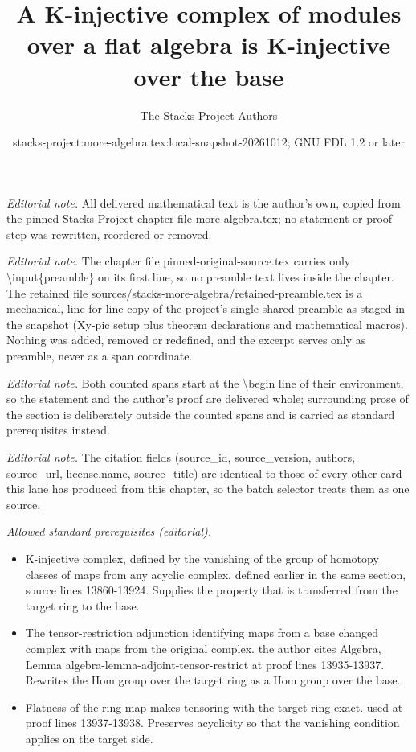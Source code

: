\documentclass[10pt,a4paper]{amsart}
\title{A K-injective complex of modules over a flat algebra is K-injective over the base}
\author{The Stacks Project Authors}
\date{stacks-project:more-algebra.tex:local-snapshot-20261012; GNU FDL 1.2 or later}
\theoremstyle{plain}
\theoremstyle{definition}
\theoremstyle{remark}
\numberwithin{equation}{subsection}
\begin{document}
\maketitle
\setcounter{subsection}{1}
\noindent\textit{Editorial note.} All delivered mathematical text is the author's own, copied from the pinned Stacks Project chapter file more-algebra.tex; no statement or proof step was rewritten, reordered or removed.\par\medskip
\noindent\textit{Editorial note.} The chapter file pinned-original-source.tex carries only \textbackslash{}input\{preamble\} on its first line, so no preamble text lives inside the chapter. The retained file sources/stacks-more-algebra/retained-preamble.tex is a mechanical, line-for-line copy of the project's single shared preamble as staged in the snapshot (Xy-pic setup plus theorem declarations and mathematical macros). Nothing was added, removed or redefined, and the excerpt serves only as preamble, never as a span coordinate.\par\medskip
\noindent\textit{Editorial note.} Both counted spans start at the \textbackslash{}begin line of their environment, so the statement and the author's proof are delivered whole; surrounding prose of the section is deliberately outside the counted spans and is carried as standard prerequisites instead.\par\medskip
\noindent\textit{Editorial note.} The citation fields (source\_id, source\_version, authors, source\_url, license.name, source\_title) are identical to those of every other card this lane has produced from this chapter, so the batch selector treats them as one source.\par\medskip
\noindent\textit{Allowed standard prerequisites (editorial).}\begin{itemize}
\item K-injective complex, defined by the vanishing of the group of homotopy classes of maps from any acyclic complex. defined earlier in the same section, source lines 13860-13924. Supplies the property that is transferred from the target ring to the base.
\item The tensor-restriction adjunction identifying maps from a base changed complex with maps from the original complex. the author cites Algebra, Lemma algebra-lemma-adjoint-tensor-restrict at proof lines 13935-13937. Rewrites the Hom group over the target ring as a Hom group over the base.
\item Flatness of the ring map makes tensoring with the target ring exact. used at proof lines 13937-13938. Preserves acyclicity so that the vanishing condition applies on the target side.
\end{itemize}\medskip
\end{document}
